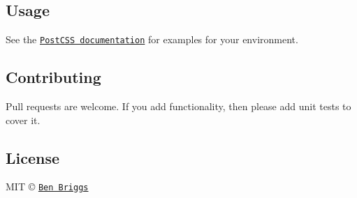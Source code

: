 \subsection*{Usage}

See the \href{https://github.com/postcss/postcss#usage}{\tt Post\+C\+SS documentation} for examples for your environment.

\subsection*{Contributing}

Pull requests are welcome. If you add functionality, then please add unit tests to cover it.

\subsection*{License}

M\+IT © \href{http://beneb.info}{\tt Ben Briggs} 